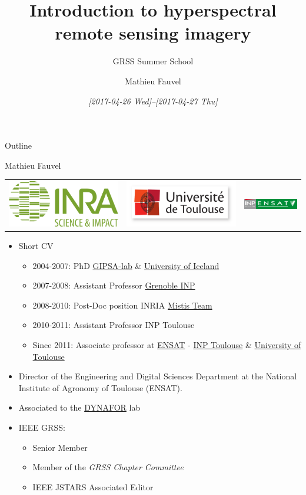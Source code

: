 \documentclass[10pt,aspectratio=1610]{beamer}
\author{Mathieu Fauvel}
\date{\textit{[2017-04-26 Wed]--[2017-04-27 Thu]}}
\title{Introduction to hyperspectral remote sensing imagery}
\subtitle{GRSS Summer School}
\institute{UMR Dynafor}
\begin{document}
\maketitle
\begin{frame}{Outline}
\tableofcontents
\end{frame}

\begin{frame}[label={sec:orga1c4676}]{Mathieu Fauvel}
\begin{center}
\begin{tabular}{ccc}
  \includegraphics[width=0.3\linewidth]{figures/logo-INRA-transp.png}
  &\includegraphics[width=0.3\linewidth]{figures/logoUT.pdf}
  &\includegraphics[width=0.3\linewidth]{figures/inp-ensat.jpg}
\end{tabular}
\end{center}
\begin{itemize}
\item Short CV
\begin{itemize}
\item 2004-2007: PhD \href{http://www.gipsa-lab.grenoble-inp.fr/}{GIPSA-lab} \& \href{http://english.hi.is/}{University of Iceland}
\item 2007-2008: Assistant Professor \href{http://www.grenoble-inp.fr/}{Grenoble INP}
\item 2008-2010: Post-Doc position INRIA \href{https://mistis.inrialpes.fr/index\_en.html}{Mistis Team}
\item 2010-2011: Assistant Professor INP Toulouse
\item Since 2011: Associate professor at  \href{http://ensat.fr/}{ENSAT} - \href{http://inp-toulouse.fr/}{INP Toulouse} \& \href{http://www.univ-toulouse.fr/}{University of Toulouse}
\end{itemize}
\item Director of the Engineering and Digital Sciences Department at the National Institute of Agronomy of Toulouse (ENSAT).
\item Associated to the \href{http://dynafor.toulouse.inra.fr/}{DYNAFOR} lab
\item IEEE GRSS:
\begin{itemize}
\item Senior Member
\item Member of the \emph{GRSS Chapter Committee}
\item IEEE JSTARS Associated Editor
\end{itemize}
\end{itemize}
\end{frame}
\end{document}
